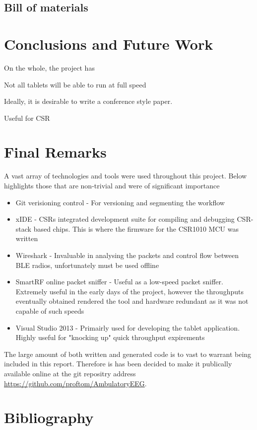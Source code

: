\documentclass[]{article}
\begin{document}
\subsection{Bill of materials}

\section{Conclusions and Future Work}
On the whole, the project has 

Not all tablets will be able to run at full speed

Ideally, it is desirable to write a conference style paper. 

Useful for CSR
\section{Final Remarks}
A vast array of technologies and tools were used throughout this project. Below highlights those that are non-trivial and were of significant importance

\begin{itemize}
	\item Git verisioning control - For versioning and segmenting the workflow
	\item xIDE - CSRs integrated development suite for compiling and debugging CSR-stack based chips. This is where the firmware for the CSR1010 MCU was written
	\item Wireshark - Invaluable in analysing the packets and control flow between BLE radios, unfortunately must be used offline
	\item SmartRF online packet sniffer - Useful as a low-speed packet sniffer. Extremely useful in the early days of the project, however the throughputs eventually obtained rendered the tool and hardware redundant as it was not capable of such speeds
	\item Visual Studio 2013 - Primairly used for developing the tablet application. Highly useful for "knocking up" quick throughput expirements 
\end{itemize}

The large amount of both written and generated code is to vast to warrant being included in this report. Therefore is has been decided to make it publically available online at the git repositry address 
\url{https://github.com/proftom/AmbulatoryEEG}.

\section{Bibliography}
\clearpage
\end{document}
